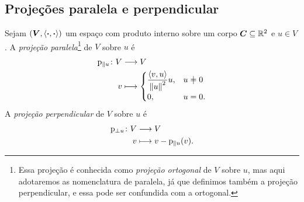 \subsection{Projeções paralela e perpendicular}

\begin{definition}
Sejam $(\bm V,\left\langle{\bm{\cdot}},{\bm{\cdot}}\right\rangle)$ um espaço com produto interno sobre um corpo $\bm C \subseteq \mathbb{R}^2$ e $u \in V$. A \emph{projeção paralela}\footnote{Essa projeção é conhecida como \emph{projeção ortogonal} de $V$ sobre $u$, mas aqui adotaremos as nomenclatura de paralela, já que definimos também a projeção perpendicular, e essa pode ser confundida com a ortogonal.} de $V$ sobre $u$ é
	\begin{align*}
	\func{\proj_{\parallel u}}{V}{V}{v}{
		\begin{cases}
			\displaystyle\frac{\inte{v}{u}}{\nor{u}^2}u,& u \neq 0 \\
			0,& u=0.
		\end{cases}
	}
	\end{align*}
A \emph{projeção perpendicular} de $V$ sobre $u$ é
	\begin{align*}
	{\mathrm{p}_{\perp u}}\colon {V} &\longrightarrow {V} \\{v} &\longmapsto v - \mathrm{p}_{\parallel u}(v).
	\end{align*}
\end{definition}

